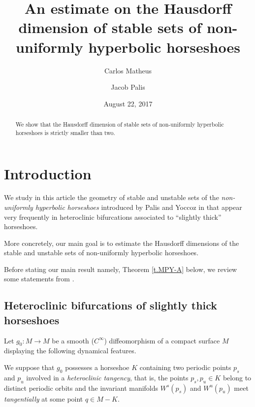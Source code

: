 \documentclass[12pt]{amsart}
\numberwithin{equation}{section}
\theoremstyle{definition}
\newcommand{\<}{{\langle}}
\renewcommand{\>}{{\rangle}}
\begin{document}
\title[On stable sets of non-uniformly hyperbolic horseshoes]{An estimate on the Hausdorff dimension of stable sets of non-uniformly hyperbolic horseshoes}
\author{Carlos Matheus}
\address{Carlos Matheus: Universit\'e Paris 13, Sorbonne Paris Cit\'e, LAGA, CNRS (UMR 7539), F-93439, Villetaneuse, France}
\author{Jacob Palis}
\address{Jacob Palis: IMPA, Estrada D. Castorina, 110, CEP 22460-320, Rio de Janeiro, RJ, Brazil}
\date{August 22, 2017}
\begin{abstract}
We show that the Hausdorff dimension of stable sets of non-uniformly hyperbolic horseshoes is strictly smaller than two.  
\end{abstract}
\maketitle

\tableofcontents

\section{Introduction}\label{intro}

We study in this article the geometry of stable and unstable sets of the 
\emph{non-uniformly hyperbolic horseshoes} 
introduced by Palis and Yoccoz in \cite{PY09} that appear very frequently in heteroclinic bifurcations associated to ``slightly thick'' horseshoes. 

More concretely, our main goal is to estimate the Hausdorff dimensions of the stable and unstable sets of non-uniformly hyperbolic horseshoes. 

Before stating our main result %
namely, Theorem \ref{t.MPY-A} below, 
we review some statements from 
\cite{PY09}.

\subsection{Heteroclinic bifurcations of slightly thick horseshoes}\label{ss.PYsetting-intro} Let $g_0:M\to M$ be a smooth ($C^{\infty}$) diffeomorphism of a compact surface $M$ displaying the following dynamical features. 

We suppose that $g_0$ possesses a horseshoe $K$ containing two periodic points $p_s$ and $p_u$ involved in a \emph{heteroclinic tangency}, that is, the points $p_s, p_u\in K$ belong to distinct periodic orbits and the invariant manifolds $W^s(p_s)$ and $W^u(p_u)$ meet \emph{tangentially} at some point $q\in M-K$. 
\end{document}
